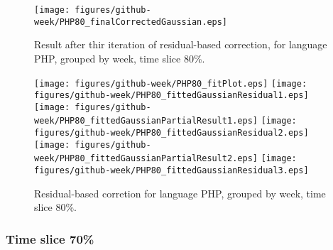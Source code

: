 \begin{figure}[]
\centering
{\texttt{[image: figures/github-week/PHP80\_finalCorrectedGaussian.eps]}}
\caption{Result after thir iteration of residual-based correction, for language PHP, grouped by week, time slice 80\%.}
\end{figure}


\begin{figure}[hb]
\centering
{}
{\texttt{[image: figures/github-week/PHP80\_fitPlot.eps]}}
{\texttt{[image: figures/github-week/PHP80\_fittedGaussianResidual1.eps]}}
{\texttt{[image: figures/github-week/PHP80\_fittedGaussianPartialResult1.eps]}}
{\texttt{[image: figures/github-week/PHP80\_fittedGaussianResidual2.eps]}}
{\texttt{[image: figures/github-week/PHP80\_fittedGaussianPartialResult2.eps]}}
{\texttt{[image: figures/github-week/PHP80\_fittedGaussianResidual3.eps]}}
\caption{Residual-based corretion for language PHP, grouped by week, time slice 80\%.}
\end{figure}


\clearpage 
\newpage 


\FloatBarrier

\subsubsection{Time slice 70\%}

